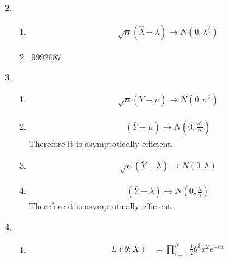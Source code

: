 \documentclass{article}
\begin{document}
\begin{enumerate}
\begin{enumerate}
\begin{equation*}
		\end{equation*}
	\end{enumerate}
\item
	\begin{enumerate}
	\item
		\begin{equation*}
		\begin{split}
		\sqrt {n} (\hat{\lambda} - \lambda) \rightarrow N(0, \lambda^{2}) 
		\end{split}
		\end{equation*}
	\item
.9992687
	\end{enumerate}
\item
	\begin{enumerate}
	\item
		\begin{equation*}
		\begin{split}
		\sqrt {n} (\bar{Y} - \mu) \rightarrow N(0, \sigma^{2})
		\end{split}
		\end{equation*}
	\item
		\begin{equation*}
		\begin{split}
		(\bar{Y} - \mu) \rightarrow N(0, \frac{\sigma^{2}}{n})
		\end{split}
		\end{equation*}
Therefore it is asymptotically efficient.
	\item
		\begin{equation*}
		\begin{split}
		\sqrt {n} (\bar{Y} - \lambda) \rightarrow N(0, \lambda)
		\end{split}
		\end{equation*}
	\item
		\begin{equation*}
		\begin{split}
		(\bar{Y} - \lambda) \rightarrow N(0, \frac{\lambda}{n})
		\end{split}
		\end{equation*}
Therefore it is asymptotically efficient.
	\end{enumerate}
\item
	\begin{enumerate}
	\item
		\begin{equation*}
		\begin{split}
		L(\theta;X) & = \prod_{i=1}^{N} \frac{1}{2} \theta^{3} x^{2} e^{-\theta x} \\

\end{split}
\end{equation*}
\end{enumerate}
\end{enumerate}
\end{document}
